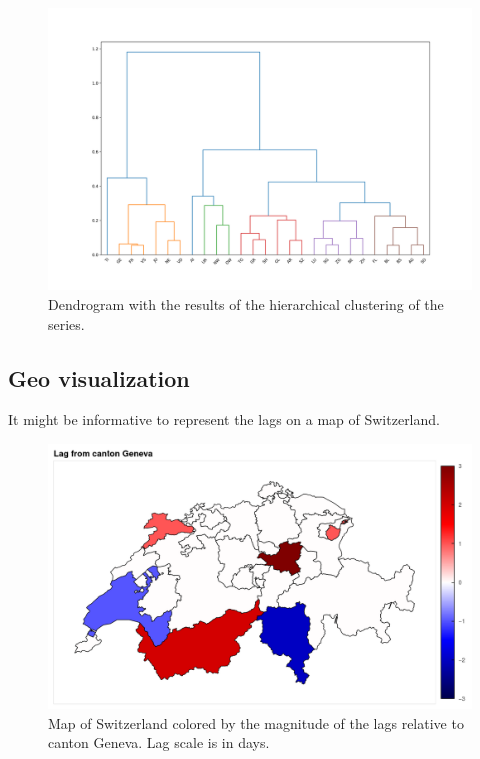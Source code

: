 \documentclass[11pt]{article}
\begin{document}
\begin{figure}
 \centering
 \includegraphics[width=\linewidth]{dendro.png}
 \caption{Dendrogram with the results of the hierarchical clustering of the series.}
 \label{fig:dendro}
\end{figure}

\subsection{Geo visualization}\label{geo-visualization}

It might be informative to represent the lags  on a map of Switzerland.

\begin{figure}
 \centering
 \includegraphics[width=\linewidth]{map_lags.png}
 \caption{Map of Switzerland colored by the magnitude of the lags relative to canton Geneva. Lag scale is in days.}
 \label{fig:maplags}
\end{figure}
\end{document}
